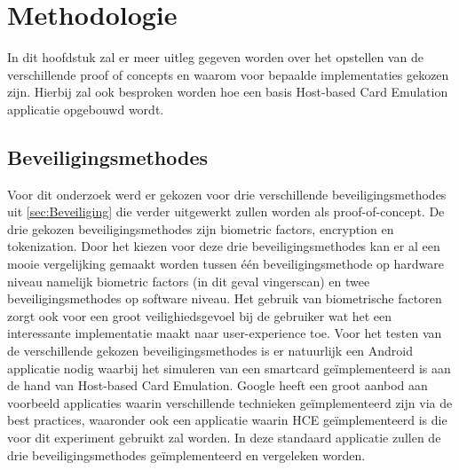 
\chapter{Methodologie}
\label{ch:methodologie}


In dit hoofdstuk zal er meer uitleg gegeven worden over het opstellen van de verschillende proof of concepts en waarom voor bepaalde implementaties gekozen zijn. Hierbij zal ook besproken worden hoe een basis Host-based Card Emulation applicatie opgebouwd wordt.

\section{Beveiligingsmethodes}

Voor dit onderzoek werd er gekozen voor drie verschillende beveiligingsmethodes uit \ref{sec:Beveiliging} die verder uitgewerkt zullen worden als proof-of-concept. De drie gekozen beveiligingsmethodes zijn biometric factors, encryption en tokenization. Door het kiezen voor deze drie beveiligingsmethodes kan er al een mooie vergelijking gemaakt worden tussen één beveiligingsmethode op hardware niveau namelijk biometric factors (in dit geval vingerscan) en twee beveiligingsmethodes op software niveau. Het gebruik van biometrische factoren zorgt ook voor een groot veilighiedsgevoel bij de gebruiker wat het een interessante implementatie maakt naar user-experience toe. Voor het testen van de verschillende gekozen beveiligingsmethodes is er natuurlijk een Android applicatie nodig waarbij het simuleren van een smartcard geïmplementeerd is aan de hand van Host-based Card Emulation. Google heeft een groot aanbod aan voorbeeld applicaties waarin verschillende technieken geïmplementeerd zijn via de best practices, waaronder ook een applicatie waarin HCE geïmplementeerd is die voor dit experiment gebruikt zal worden. In deze standaard applicatie zullen de drie beveiligingsmethodes geïmplementeerd en vergeleken worden. 



